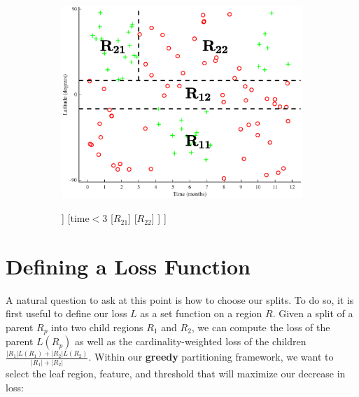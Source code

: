 \documentclass{article}
\begin{document}
\begin{figure}[H]
\begin{subfigure}[t]{\textwidth}
	\centering
	\begin{minipage}[t]{.35\linewidth}
		\centering
		\includegraphics[width=\linewidth]{ski-split3.eps}
		\caption{}
		\label{fig:step3}
	\end{minipage}
	\begin{minipage}[t]{.6\linewidth}
		\qquad
		\begin{forest}
		[$\text{loc} < 15$, tikz={\draw[{Latex}-, thick] (.north) --++ (0,1);}
    			[$\text{loc} < -15$
            			[$R_{11}$] 
           		 	[$R_{12}$] 
        		]   
   			[$\text{time} < 3$
        			[$R_{21}$] 
        			[$R_{22}$]  
   			]   
		] 
		\end{forest}
	\end{minipage}
\end{subfigure}
\end{figure}

\section{Defining a Loss Function}

A natural question to ask at this point is how to choose our splits.  To do so, it is first useful to define our loss $L$ as a set function on a region $R$.  Given a split of a parent $R_p$ into two child regions $R_1$ and $R_2$, we can compute the loss of the parent $L(R_p)$ as well as the cardinality-weighted loss of the children $\frac{|R_1| L(R_1) + |R_2| L(R_2)}{|R_1| + |R_2|}$.  Within our {\bf greedy} partitioning framework, we want to select the leaf region, feature, and threshold that will maximize our decrease in loss:
\end{document}
